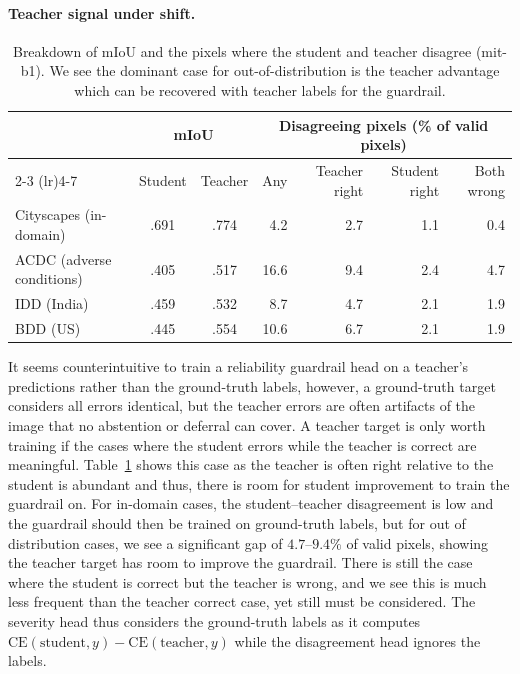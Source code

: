 \documentclass{article}
\begin{document}
\paragraph{Teacher signal under shift.}

\begin{table}[H]
\centering
\small
\setlength{\tabcolsep}{5pt}
\caption{Breakdown of mIoU and the pixels where the student and teacher disagree (mit-b1). We see the dominant case for out-of-distribution is the teacher advantage which can be recovered with teacher labels for the guardrail.}
\label{tab:diag}
\begin{tabular}{lccrrrr}
\toprule
 & \multicolumn{2}{c}{mIoU} & \multicolumn{4}{c}{Disagreeing pixels (\% of valid pixels)} \\
\cmidrule(lr){2-3} \cmidrule(lr){4-7}
 & Student & Teacher & Any & Teacher right & Student right & Both wrong \\
\midrule
Cityscapes (in-domain) & .691 & .774 & 4.2 & 2.7 & 1.1 & 0.4 \\
ACDC (adverse conditions) & .405 & .517 & 16.6 & 9.4 & 2.4 & 4.7 \\
IDD (India) & .459 & .532 & 8.7 & 4.7 & 2.1 & 1.9 \\
BDD (US) & .445 & .554 & 10.6 & 6.7 & 2.1 & 1.9 \\
\bottomrule
\end{tabular}
\end{table}

It seems counterintuitive to train a reliability guardrail head on a teacher's predictions rather than the ground-truth labels, however, a ground-truth target considers all errors identical, but the teacher errors are often artifacts of the image that no abstention or deferral can cover. A teacher target is only worth training if the cases where the student errors while the teacher is correct are meaningful. Table~\ref{tab:diag} shows this case as the teacher is often right relative to the student is abundant and thus, there is room for student improvement to train the guardrail on. For in-domain cases, the student--teacher disagreement is low and the guardrail should then be trained on ground-truth labels, but for out of distribution cases, we see a significant gap of $4.7$--$9.4\%$ of valid pixels, showing the teacher target has room to improve the guardrail. There is still the case where the student is correct but the teacher is wrong, and we see this is much less frequent than the teacher correct case, yet still must be considered. The severity head thus considers the ground-truth labels as it computes $\mathrm{CE}(\text{student}, y) - \mathrm{CE}(\text{teacher}, y)$ while the disagreement head ignores the labels.
\end{document}
